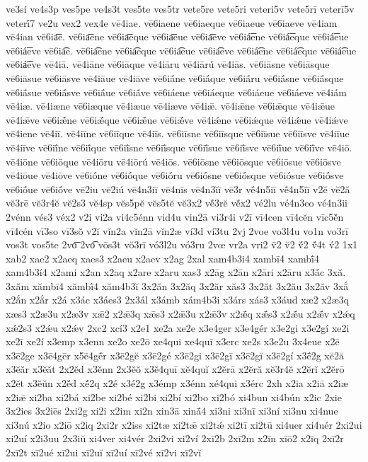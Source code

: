 {ve3sí
ve4s3p
ves5pe
ve4s3t
ves5te
ves5tr
vete5re
vete5ri
veteri5v
vete5rī
veterī5v
veterī́7
ve2u
vex2
vex4e
vē4iae.
vē6iaene
vē6iaeque
vē6iaeue
vē6iaeve
vē4iam
vē4ian
vē6ia͞e.
vē6ia͞ene
vē6ia͞eque
vē6ia͞eue
vē6ia͞eve
vē6iá͞ene
vē6iá͞eque
vē6iá͞eue
vē6iá͞eve
vē6ia͡e.
vē6ia͡ene
vē6ia͡eque
vē6ia͡eue
vē6ia͡eve
vē6iá͡ene
vē6iá͡eque
vē6iá͡eue
vē6iá͡eve
vē4iā.
vē4iāne
vē6iāque
vē4iāru
vē4iārú
vē4iās.
vē6iāsne
vē6iāsque
vē6iāsue
vē6iāsve
vē4iāue
vē4iāve
vē6iā́ne
vē6iā́que
vē6iā́ru
vē6iā́sne
vē6iā́sque
vē6iā́sue
vē6iā́sve
vē6iā́ue
vē6iā́ve
vē6iáene
vē6iáeque
vē6iáeue
vē6iáeve
vē4iám
vē4iæ.
vē4iæne
vē6iæque
vē4iæue
vē4iæve
vē4iǣ.
vē4iǣne
vē6iǣque
vē4iǣue
vē4iǣve
vē6iǣ́ne
vē6iǣ́que
vē6iǣ́ue
vē6iǣ́ve
vē4iǽne
vē6iǽque
vē4iǽue
vē4iǽve
vē4iene
vē4iī.
vē4iīne
vē6iīque
vē4iīs.
vē6iīsne
vē6iīsque
vē6iīsue
vē6iīsve
vē4iīue
vē4iīve
vē6iī́ne
vē6iī́que
vē6iī́sne
vē6iī́sque
vē6iī́sue
vē6iī́sve
vē6iī́ue
vē6iī́ve
vē4iō.
vē4iōne
vē6iōque
vē4iōru
vē4iōrú
vē4iōs.
vē6iōsne
vē6iōsque
vē6iōsue
vē6iōsve
vē4iōue
vē4iōve
vē6iṓne
vē6iṓque
vē6iṓru
vē6iṓsne
vē6iṓsque
vē6iṓsue
vē6iṓsve
vē6iṓue
vē6iṓve
vē2iu
vē2iú
vē4n3iī
vē4nīs
vē4n3ĭī
vē3r
vḗ4n5iī
vḗ4n5ĭī
v2ĕ
vĕ2ă
vĕ3rē
vĕ3r4ĕ
vĕ2s3
vĕ4sp
vĕs5pĕ
vĕs5tĕ
vĕ3x2
vĕ́3rĕ
vĕ́x2
vé2lu
vé4n3eo
vé4n3ii
2vénn
vés3
véx2
v2i
vi2a
vi4c5énn
vid4u
vin2ā
vi3r4i
v2ī
vī4cen
vī4cĕn
vīc5ĕ́n
vī4cén
vī3so
vī3sŏ
v2ĭ
vĭn2a
vĭn2ā
vĭn2æ
ví3d
ví3tu
2vj
2voe
vo3l4u
vo1n
vo3rī
vos3t
vos5te
2vo͞
2vo͡
vōs3t
vŏ3rī
vó3l2u
vó3ru
2vœ
vr2a
vri2
v̄2
v̆2
v̆́2
v̆́4t
v́2
1x1
xab2
xae2
x2aeq
xaes3
x2aeu
x2aev
x2ag
2xal
xam4b3i4
xambī4
xambī́4
xam4b3í4
x2ami
x2an
x2aq
x2are
x2aru
xas3
x2āg
x2ān
x2āri
x2āru
x3ā́c
3xă.
3xăm
xămbī4
xămbī́4
xăm4b3ĭ
3x2ăn
3x2ăq
3x2ăr
xăs3
3x2ăt
3x2ău
3x2ăv
3xắ
x2ắn
x2ắr
x2á
x3ác
x3áes3
2x3ál
x3ámb
xám4b3i
x3árs
xás3
x3áud
xæ2
x2æ3q
xæs3
x2æ3u
x2æ3v
xǣ2
x2ǣ3q
xǣs3
x2ǣ3u
x2ǣ3v
x2ǣ́q
xǣ́s3
x2ǣ́u
x2ǣ́v
x2ǽq
xǽ2s3
x2ǽu
x2ǽv
2xc2
xcí3
x2e1
xe2a
xe2e
x3e4ger
x3e4gér
x3e2gi
x3e2gí
xe2i
xe2ī
xe2í
x3emp
x3enn
xe2o
xe2ō
xe4qui
xe4quī
x3erc
xe2s
x3e2u
3x4eue
x2ē
x3ē2ge
x3ē4gēr
x5ē4gḗr
x3ē2gĕ
x3ē2gé
x3ē2gi
x3ē2gī
x3ē2gĭ
x3ē2gí
x3ḗ2g
xĕ2ă
x3ĕăr
x3ĕăt
2x2ĕd
x3ĕnn
2x3ĕŏ
x3ĕ4quī
xĕ4quĭ
x2ĕrā
x2ĕră
xĕ3r4ĕ
x2ĕrĭ
x2ĕrō
x2ĕt
x3ĕŭn
x2ĕ́d
xĕ́2q
x2é
x3é2g
x3émp
x3énn
xé4qui
x3érc
2xh
x2ia
x2iā
x2iæ
x2iǣ
xi2ba
xi2bá
xi2be
xi2bé
xi2bi
xi2bí
xi2bo
xi2bó
xi4bun
xi4bún
x2ic
2xie
3x2ies
3x2iēs
2xi2g
xi2i
x2im
xi2n
xin3ā
xinā́4
xi3ni
xi3nī
xi3ní
xi3nu
xi4nue
xi3nú
x2io
x2iō
x2iq
2xi2r
x2iss
xi2tæ
xi2tǣ
xi2tǽ
xi2tī
xi2tū
xi4uer
xi4uér
2xi2ui
xi2uí
x2i3uu
2x3iŭ
xi4ver
xi4vér
2xi2vi
xi2ví
2xī2b
2xī2m
x2īn
xīō2
x2īq
2xī2r
2xī2t
xī2ué
xī2ui
xī2uĭ
xī2uí
xī2vé
xī2vi
xī2vĭ
}
